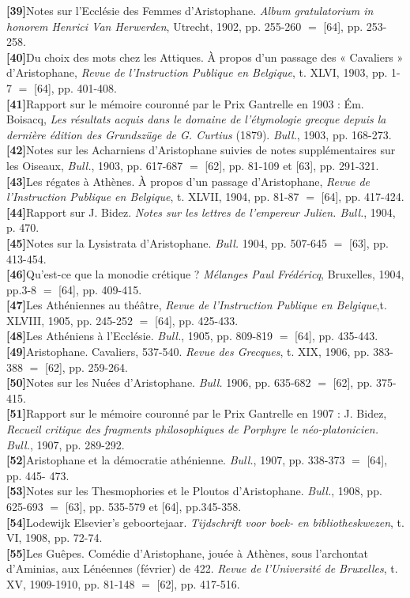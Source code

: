 \documentclass{book}%
\newcommand{\italique}[1]{\textit{#1}}%
\newcommand{\biblio}[2]{\hspace*{-1.5cm}\textbf{[#1]}\hspace*{1.5cm}#2\\

}
\begin{document}
\biblio{39}{Notes sur l'Ecclésie des Femmes d'Aristophane. \italique{Album gratulatorium in honorem Henrici Van Herwerden}, Utrecht, 1902, pp. 255-260 $=$ [64], pp. 253-258.}%
\biblio{40}{Du choix des mots chez les Attiques. À propos d'un passage des « Cavaliers » d'Aristophane, \italique{Revue de l'Instruction Publique en Belgique}, t. XLVI, 1903, pp. 1-7 $=$ [64], pp. 401-408.}%
\biblio{41}{Rapport sur le mémoire couronné par le Prix Gantrelle en 1903 : Ém. Boisacq, \italique{Les résultats acquis dans le domaine de l'étymologie grecque depuis la dernière édition des Grundszüge de G. Curtius} (1879). \italique{Bull.}, 1903, pp. 168-273.}%
\biblio{42}{Notes sur les Acharniens d'Aristophane suivies de notes supplémentaires sur les Oiseaux, \italique{Bull.}, 1903, pp. 617-687 $=$ [62], pp. 81-109 et [63], pp. 291-321.}%
\biblio{43}{Les régates à Athènes. À propos d'un passage d'Aristophane, \italique{Revue de l'Instruction Publique en Belgique}, t. XLVII, 1904, pp. 81-87 $=$ [64], pp. 417-424.}%
\biblio{44}{Rapport sur J. Bidez. \italique{Notes sur les lettres de l'empereur Julien. Bull.}, 1904, p. 470.}%
\biblio{45}{Notes sur la Lysistrata d'Aristophane. \italique{Bull.} 1904, pp. 507-645 $=$ [63], pp. 413-454.}%
\biblio{46}{Qu'est-ce que la monodie crétique ? \italique{Mélanges Paul Frédéricq}, Bruxelles, 1904, pp.3-8 $=$ [64], pp. 409-415.}%
\biblio{47}{Les Athéniennes au théâtre, \italique{Revue de l'Instruction Publique en Belgique},t. XLVIII, 1905, pp. 245-252 $=$ [64], pp. 425-433.}%
\biblio{48}{Les Athéniens à l'Ecclésie. \italique{Bull.}, 1905, pp. 809-819 $=$ [64], pp. 435-443.}%
\biblio{49}{Aristophane. Cavaliers, 537-540. \italique{Revue des Grecques}, t. XIX, 1906, pp. 383-388 $=$ [62], pp. 259-264.}%
\biblio{50}{Notes sur les Nuées d'Aristophane. \italique{Bull.} 1906, pp. 635-682 $=$ [62], pp. 375-415.}%
\biblio{51}{Rapport sur le mémoire couronné par le Prix Gantrelle en 1907 : J. Bidez, \italique{Recueil critique des fragments philosophiques de Porphyre le néo-platonicien. Bull.}, 1907, pp. 289-292.}%
\biblio{52}{Aristophane et la démocratie athénienne. \italique{Bull.}, 1907, pp. 338-373 $=$ [64], pp. 445- 473.}%
\biblio{53}{Notes sur les Thesmophories et le Ploutos d'Aristophane. \italique{Bull.}, 1908, pp. 625-693 $=$ [63], pp. 535-579 et [64], pp.345-358.}%
\biblio{54}{Lodewijk Elsevier's geboortejaar. \italique{Tijdschrift voor boek- en bibliotheskwezen}, t. VI, 1908, pp. 72-74.}%
\biblio{55}{Les Guêpes. Comédie d'Aristophane, jouée à Athènes, sous l'archontat d'Aminias, aux Lénéennes (février) de 422. \italique{Revue de l'Université de Bruxelles}, t. XV, 1909-1910, pp. 81-148 $=$ [62], pp. 417-516.}%
\end{document}
